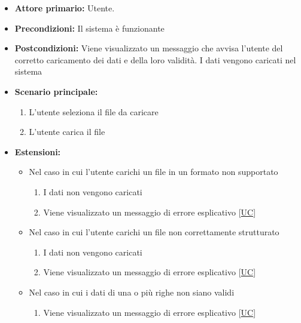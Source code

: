 \begin{itemize}
    \item \textbf{Attore primario:} Utente.
    \item \textbf{Precondizioni:} Il sistema è funzionante
    \item \textbf{Postcondizioni:} Viene visualizzato un messaggio che avvisa l'utente del corretto caricamento dei dati e della loro validità. 
                                   I dati vengono caricati nel sistema
    \item \textbf{Scenario principale:}
          \begin{enumerate}
              \item L'utente seleziona il file da caricare
              \item L'utente carica il file
          \end{enumerate}
    \item \textbf{Estensioni:}
    \begin{itemize}
        \item   Nel caso in cui l'utente carichi un file in un formato non supportato
                \begin{enumerate}
                    \item I dati non vengono caricati
                    \item Viene visualizzato un messaggio di errore esplicativo [\hyperref[sec:UC - Errore formato file]{UC}] %
                \end{enumerate}
        \item   Nel caso in cui l'utente carichi un file non correttamente strutturato
                \begin{enumerate}
                    \item I dati non vengono caricati
                    \item Viene visualizzato un messaggio di errore esplicativo [\hyperref[sec:UC - Errore struttura dataset]{UC}]
                \end{enumerate}
        \item   Nel caso in cui i dati di una o più righe non siano validi
                \begin{enumerate}
                    \item Viene visualizzato un messaggio di errore esplicativo [\hyperref[sec:UC - Errore validita riga]{UC}] %
                \end{enumerate}
    \end{itemize} 
\end{itemize}

